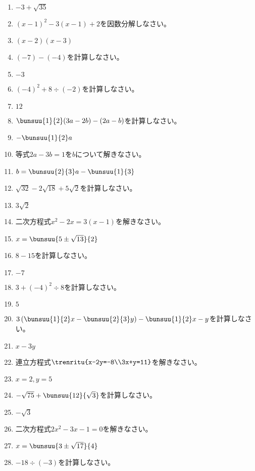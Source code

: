 \documentclass[uplatex,a4j,11pt]{jsreport}
\begin{document}
\begin{multicols}{2}
\begin{enumerate}
    \item $-3+\sqrt{35}$
    \item $(x-1)^2-3(x-1)+2$\quad を因数分解しなさい。%
    \item $(x-2)(x-3)$
    \item $(-7)-(-4)$\quad を計算しなさい。%
    \item $-3$
    \item $(-4)^2+8\div (-2)$\quad を計算しなさい。%
    \item $12$
    \item $\bunsuu{1}{2}(3a-2b)-(2a-b)$\quad を計算しなさい。%
    \item $-\bunsuu{1}{2}a$
    \item 等式\quad$2a-3b=1$\quad を\quad$b$\quad について解きなさい。%
    \item $b=\bunsuu{2}{3}a-\bunsuu{1}{3}$
    \item $\sqrt{32}-2\sqrt{18}+5\sqrt{2}$\quad を計算しなさい。%
    \item $3\sqrt{2}$
    \item 二次方程式\quad$x^2-2x=3(x-1)$\quad を解きなさい。%
    \item $x=\bunsuu{5\pm\sqrt{13}}{2}$
    \item $8-15$\quad を計算しなさい。%
    \item $-7$
    \item $3+(-4)^2\div 8$\quad を計算しなさい。%
    \item $5$
    \item $3\left(\bunsuu{1}{2}x-\bunsuu{2}{3}y\right)-\bunsuu{1}{2}x-y$\quad を計算しなさい。%
    \item $x-3y$
    \item 連立方程式\quad$\trenritu{x-2y=-8\\3x+y=11}$\quad を解きなさい。%
    \item $x=2, y=5$
    \item $-\sqrt{75}+\bunsuu{12}{\sqrt{3}}$\quad を計算しなさい。%
    \item $-\sqrt{3}$
    \item 二次方程式\quad$2x^2-3x-1=0$\quad を解きなさい。%
    \item $x=\bunsuu{3\pm\sqrt{17}}{4}$
    \item $-18\div (-3)$\quad を計算しなさい。%

\end{enumerate}
\end{multicols}
\end{document}
